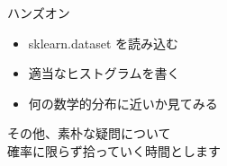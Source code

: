 \documentclass[dvipdfmx,cjk]{beamer}
\begin{document}
\begin{frame}{ハンズオン} \pause

\begin{itemize}
    \item sklearn.dataset を読み込む \pause
    \item 適当なヒストグラムを書く \pause
    \item 何の数学的分布に近いか見てみる \pause
\end{itemize}

\vskip 1cm
その他、素朴な疑問について\\確率に限らず拾っていく時間とします

\end{frame}


\end{document}
